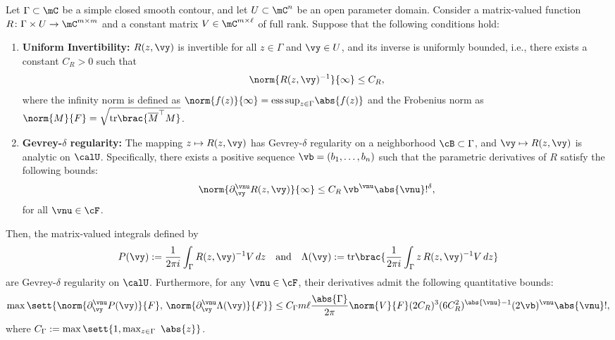     \begin{lemma} \label{lem:gevrey_integral}
		Let $\Gamma \subset \mC$ be a simple closed smooth contour, and let $U \subset \mC^n$ be an open parameter domain. Consider a matrix-valued function $R \colon \Gamma \times U \to \mC^{m \times m}$ and a constant matrix $V \in \mC^{m \times \ell}$ of full rank. Suppose that the following conditions hold:
		\begin{enumerate}
			\item[(i)] \textbf{Uniform Invertibility:} $R(z, \vy)$ is invertible for all $z \in \Gamma$ and $\vy \in U$, and its inverse is uniformly bounded, i.e., there exists a constant $C_R > 0$ such that
			\begin{equation}\label{eq:bounded inverse}
				\norm{R(z, \vy)^{-1}}{\infty} \le C_R,
			\end{equation}
			where the infinity norm is defined as $\norm{f(z)}{\infty}=\mathrm{ess\,sup}_{z\in\Gamma} \abs{f(z)}$ and the Frobenius norm as $\norm{M}{F}=\sqrt{{\mathrm{tr}\brac{\overline{M}^{\top}M}}}$.
			
			\item[(ii)] \textbf{Gevrey-$\delta$ regularity:} The mapping $z \mapsto R(z, \vy)$ has Gevrey-$\delta$ regularity on a neighborhood $\cB\subset\Gamma$, and $\vy \mapsto R(z, \vy)$ is analytic on $\calU$. Specifically, there exists a positive sequence $\vb = (b_1, \dots, b_n)$ such that the parametric derivatives of $R$ satisfy the following bounds:
			\begin{equation}\label{eq:analytic}
			\norm{\partial_{\vy}^{\vnu} R(z, \vy)}{\infty} \le C_R\, \vb^\vnu \abs{\vnu}!^{\delta},
			\end{equation}
			for all $\vnu \in \cF$.
		\end{enumerate}
		Then, the matrix-valued integrals defined by
		\begin{equation}
			P(\vy) := \frac{1}{2\pi i} \int_{\Gamma} R(z, \vy)^{-1} V \, dz 
			\quad \text{and} \quad 
			\Lambda(\vy) := \mathrm{tr} \brac{\frac{1}{2\pi i} \int_{\Gamma} z \, R(z, \vy)^{-1} V \, dz}
		\end{equation}
		are Gevrey-$\delta$ regularity on $\calU$. Furthermore, for any $\vnu \in \cF$, their derivatives admit the following quantitative bounds:
		\begin{equation}
			\max \sett{ \norm{\partial_{\vy}^\vnu P(\vy)}{F}, \, \norm{\partial_{\vy}^\vnu \Lambda(\vy)}{F} }
			\le C_\Gamma m \ell \frac{\abs{\Gamma}}{2\pi} \norm{V}{F} (2C_R)^3 (6C_R^2)^{\abs{\vnu}-1} (2\vb)^\vnu \abs{\vnu}!,
		\end{equation}
		where $C_\Gamma :=\max\sett{1,  \max_{z \in \Gamma} \ \abs{z}}$.
	\end{lemma}


